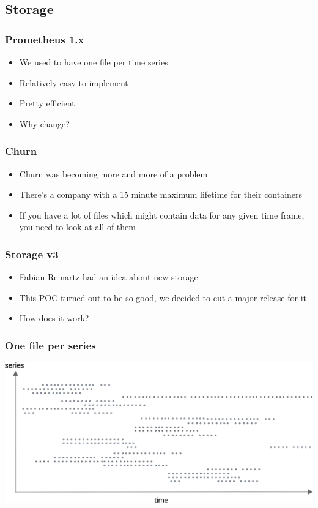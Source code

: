 \documentclass[t]{beamer}
\begin{document}
\subsection{Storage}

\begin{frame}
	\frametitle{Prometheus 1.x}
	\begin{itemize}
		\item We used to have one file per time series
		\item Relatively easy to implement
		\item Pretty efficient
		\item Why change?
	\end{itemize}
\end{frame}

\begin{frame}
	\frametitle{Churn}
	\begin{itemize}
		\item Churn was becoming more and more of a problem
		\item There's a company with a 15 minute maximum lifetime for their containers
		\item If you have a lot of files which might contain data for any given time frame, you need to look at all of them
	\end{itemize}
\end{frame}

\begin{frame}
	\frametitle{Storage v3}
	\begin{itemize}
		\item Fabian Reinartz had an idea about new storage
		\item This POC turned out to be so good, we decided to cut a major release for it
		\item How does it work?
	\end{itemize}
\end{frame}

\begin{frame}
	\frametitle{One file per series}
	\includegraphics[width=\textwidth]{storage--file_per_series.png}
\end{frame}
\end{document}
